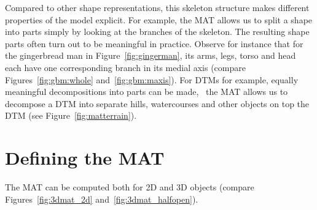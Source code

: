 Compared to other shape representations, this skeleton structure makes different properties of the model explicit.
For example, the MAT allows us to split a shape into parts simply by looking at the branches of the skeleton. 
The resulting shape parts often turn out to be meaningful in practice. 
Observe for instance that for the gingerbread man in Figure~\ref{fig:gingerman}, its arms, legs, torso and head each have one corresponding branch in its medial axis (compare Figures~\ref{fig:gbm:whole} and~\ref{fig:gbm:maxis}).
For DTMs for example, equally meaningful decompositions into parts can be made, \eg\ the MAT allows us to decompose a DTM into separate hills, watercourses and other objects on top the DTM (see Figure~\ref{fig:matterrain}).

\section{Defining the MAT}
The MAT can be computed both for 2D and 3D objects (compare Figures~\ref{fig:3dmat_2d} and~\ref{fig:3dmat_halfopen}).
